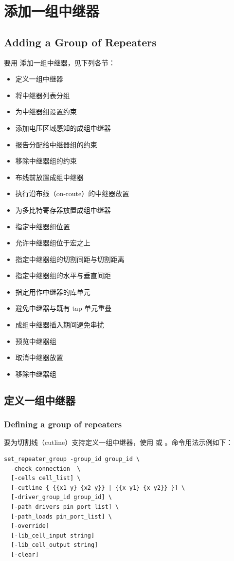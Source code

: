 \section{添加一组中继器}
\subsection*{Adding a Group of Repeaters}

要用  添加一组中继器，见下列各节：
\begin{itemize}
  \item 定义一组中继器
  \item 将中继器列表分组
  \item 为中继器组设置约束
  \item 添加电压区域感知的成组中继器
  \item 报告分配给中继器组的约束
  \item 移除中继器组的约束
  \item 布线前放置成组中继器
  \item 执行沿布线（on-route）的中继器放置
  \item 为多比特寄存器放置成组中继器
  \item 指定中继器组位置
  \item 允许中继器组位于宏之上
  \item 指定中继器组的切割间距与切割距离
  \item 指定中继器组的水平与垂直间距
  \item 指定用作中继器的库单元
  \item 避免中继器与既有 tap 单元重叠
  \item 成组中继器插入期间避免串扰
  \item 预览中继器组
  \item 取消中继器放置
  \item 移除中继器组
\end{itemize}

\subsection{定义一组中继器}
\subsubsection*{Defining a group of repeaters}

要为切割线（cutline）支持定义一组中继器，使用  或 。命令用法示例如下：
\begin{lstlisting}
set_repeater_group -group_id group_id \
  -check_connection  \
  [-cells cell_list] \
  [-cutline { {{x1 y} {x2 y}} | {{x y1} {x y2}} }] \
  [-driver_group_id group_id] \
  [-path_drivers pin_port_list] \
  [-path_loads pin_port_list] \
  [-override]
  [-lib_cell_input string]
  [-lib_cell_output string]
  [-clear]
\end{lstlisting}

